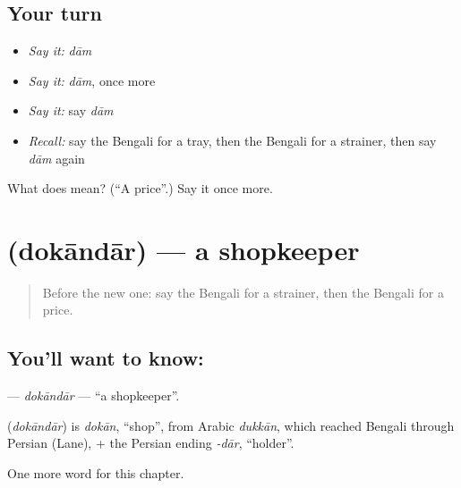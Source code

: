 \subsection*{Your turn}
\begin{itemize}
\raggedright
  \item \emph{Say it:} \emph{dām}
  \item \emph{Say it:} \emph{dām}, once more
  \item \emph{Say it:} say \emph{dām}
  \item \emph{Recall:} say the Bengali for a tray, then the Bengali for a strainer, then say \emph{dām} again
\end{itemize}

\begin{tcolorbox}[breakable,colback=teal!4,colframe=teal!35!black,title={Before you move on}]
What does  mean? (\textquotedblleft{}A price\textquotedblright{}.) Say it once more.
\end{tcolorbox}
\section[\texorpdfstring{\bn{দোকানদার} (dokāndār)}{দোকানদার (dokāndār)}]{ (dokāndār) — a shopkeeper}

\label{lesson:BN-C207-dokandar}



\begin{quote}
Before the new one: say the Bengali for a strainer, then the Bengali for a price.
\end{quote}

\subsection*{You'll want to know: }
\textbf{} — \emph{dokāndār} — \textquotedblleft{}a shopkeeper\textquotedblright{}.

\begin{cousinweb}
\textbf{} (\emph{dokāndār}) is \emph{dokān}, \textquotedblleft{}shop\textquotedblright{}, from Arabic \emph{dukkān}, which reached Bengali through Persian (Lane), + the Persian ending \emph{-dār}, \textquotedblleft{}holder\textquotedblright{}.
\end{cousinweb}

\begin{grammarlens}[title={What you've built}]
One more word for this chapter.
\end{grammarlens}

